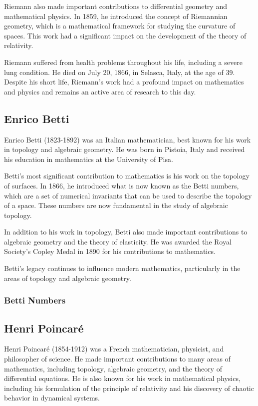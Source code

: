 \documentclass{IEEEcsmag}
\begin{document}
    Riemann also made important contributions to differential geometry and mathematical physics. In 1859, he 
    introduced the concept of Riemannian geometry, which is a mathematical framework for studying the curvature of 
    spaces. This work had a significant impact on the development of the theory of relativity.

    Riemann suffered from health problems throughout his life, including a severe lung condition. He died on July 20, 
    1866, in Selasca, Italy, at the age of 39. Despite his short life, Riemann's work had a profound impact on 
    mathematics and physics and remains an active area of research to this day.
  
  \subsection{Enrico Betti}
    Enrico Betti (1823-1892) \cite{editors2002betti} was an Italian mathematician, best known for his work in topology 
    and algebraic geometry. He was born in Pistoia, Italy and received his education in mathematics at the University 
    of Pisa.

    Betti's most significant contribution to mathematics is his work on the topology of surfaces. In 1866, he 
    introduced what is now known as the Betti numbers, which are a set of numerical invariants that can be used 
    to describe the topology of a space. These numbers are now fundamental in the study of algebraic topology.

    In addition to his work in topology, Betti also made important contributions to algebraic geometry and the 
    theory of elasticity. He was awarded the Royal Society's Copley Medal in 1890 for his contributions to 
    mathematics.

    Betti's legacy continues to influence modern mathematics, particularly in the areas of topology and 
    algebraic geometry.

    \subsubsection{Betti Numbers}

  \subsection{Henri Poincaré}
    Henri Poincaré (1854-1912) was a French mathematician, physicist, and philosopher of science. He made 
    important contributions to many areas of mathematics, including topology, algebraic geometry, and the theory 
    of differential equations. He is also known for his work in mathematical physics, including his formulation 
    of the principle of relativity and his discovery of chaotic behavior in dynamical systems.
\end{document}

